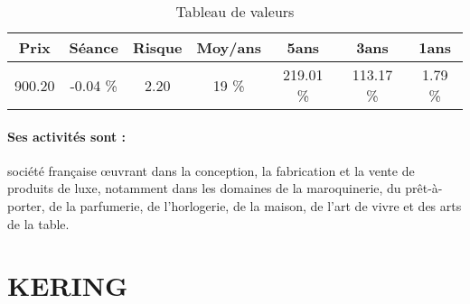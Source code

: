 \documentclass[11pt,a4paper]{report}%
\begin{document}
\begin{table}[H]
  \centering
    \begin{tabular}{|c|c|c|c|c|c|c|}
    \hline
    Prix & Séance & Risque  & Moy/ans & 5ans & 3ans & 1ans \\
    \hline
    900.20 &    -0.04 \%    & 2.20 & 19 \% & 219.01 \% & 113.17 \% & 1.79 \% \\
    \hline
    \end{tabular}%
        \label{tab:table_HERMES INTL}%
      \caption{Tableau de valeurs}
\end{table}%

\paragraph{Ses activités sont : } société française œuvrant dans la conception, la fabrication et la vente de produits de luxe, notamment dans les domaines de la maroquinerie, du prêt-à-porter, de la parfumerie, de l'horlogerie, de la maison, de l'art de vivre et des arts de la table. 
    
    \newpage

\section{KERING}
\end{document}
